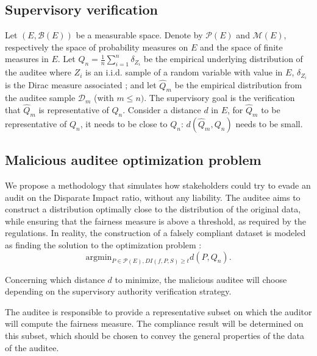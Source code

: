 \documentclass[runningheads, orivec]{llncs}
\begin{document}
\subsection{Supervisory verification}

Let $(E,\mathcal{B}(E))$ be a measurable space. Denote by $\mathcal{P}(E)$ and $\mathcal{M}(E)$, respectively the space of probability measures on $E$ and the space of finite measures in $E$. Let $Q_n =\frac{1}{n} \sum_{i=1}^n \delta_{Z_i}$ be the empirical underlying distribution of the auditee where $Z_i$ is an i.i.d. sample of a random variable with value in $E$, $\delta_{Z_i}$ is the Dirac measure associated ; and let $\widehat{Q}_{m}$ be the empirical distribution from the auditee sample $\mathcal{D}_m$ (with $m \leq n)$. The supervisory goal is the verification that  $\widehat{Q}_{m}$ is representative of $Q_n$. %
Consider a distance $d$ in $E$, for $\widehat{Q}_{m}$ to be representative of $Q_n$, it needs to be close to $Q_n$: $d(\widehat{Q}_{m},Q_n)$ needs to be small.

\subsection{Malicious auditee optimization problem} \label{s:method}

We propose a methodology that simulates how stakeholders could try to evade an audit on the Disparate Impact ratio, without any liability. The auditee aims to construct a distribution optimally close to the distribution of the original data, while ensuring that the fairness measure is above a threshold, as required by the regulations. In reality, the construction of a falsely compliant dataset is modeled as finding the solution to the optimization problem : 
\begin{equation}
    \mathrm{argmin}_{P\in \mathcal{P}(E), DI(f,P,S)  \geq t} d(P,Q_n).
\end{equation}

Concerning which distance $d$ to minimize, the malicious auditee will choose depending on the supervisory authority verification strategy. 

\begin{remark}
The auditee is responsible to provide a representative subset on which the auditor will compute the fairness measure. The compliance result will be determined on this subset, which  should be chosen to convey the general properties of the data of the auditee.
\end{remark}
\end{document}
